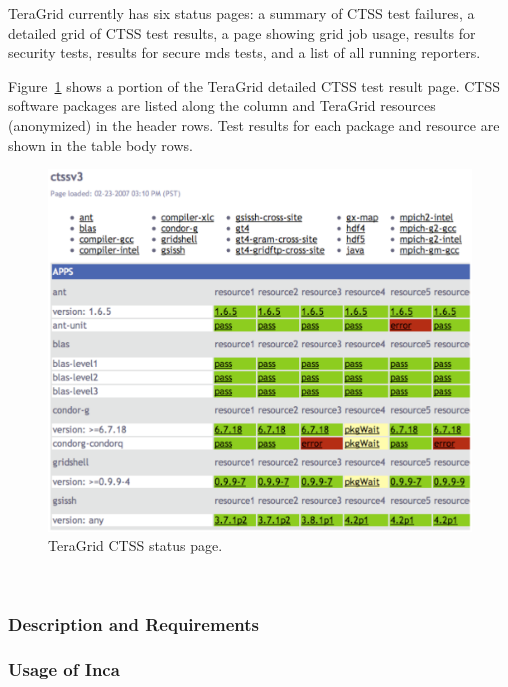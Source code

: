 \documentclass[times,10pt,twocolumn]{article}
\begin{document}

TeraGrid currently has six status pages: a summary of CTSS test
failures, a detailed grid of CTSS test results, a page showing grid job
usage, results for security tests, results for secure mds tests, and a list of
all running reporters.

Figure~\ref{status_page_fig} shows a portion of the TeraGrid detailed CTSS test result
page.  CTSS software packages are listed along the column and TeraGrid
resources (anonymized) in the header rows.  Test results for each package and
resource are shown in the table body rows.

\begin{figure}[hbt]
  \centering
  \includegraphics[scale=0.4]{status-page.eps}
  \caption{TeraGrid CTSS status page.}
  \label{status_page_fig}
\end{figure}

~\newpage


\subsubsection{Description and Requirements}


\subsubsection{Usage of Inca}
\end{document}
